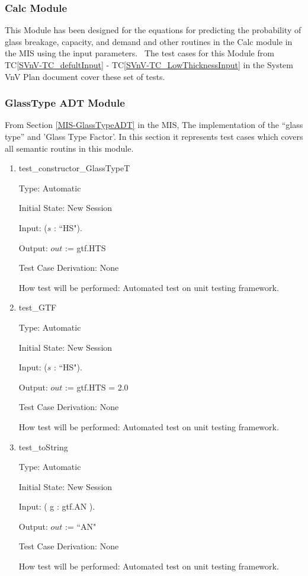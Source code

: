 \documentclass[12pt]{article}
\newcommand{\tcref}[1]{TC\ref{#1}}
\newcounter{utestnum} %
\begin{document}
\subsubsection{Calc Module}
	
This Module has been designed for the equations for predicting the probability of glass 
breakage, capacity, and demand and other routines in the Calc module in the MIS using the input parameters.
~\newline The test cases for this Module from \tcref{SVnV-TC_defultInput} - 
\tcref{SVnV-TC_LowThicknessInput} in the System VnV Plan document cover these set of tests. 

\subsubsection{GlassType ADT Module}	
From Section \ref{MIS-GlassTypeADT} in the MIS, The implementation of the ``glass type'' and 'Glass Type Factor'. In this section it represents test cases which covers all semantic routins in this module.

\begin{enumerate}[label=TC\arabic*:,ref={\arabic*}]
	
	\item [TC\refstepcounter{utestnum}\theutestnum: \label{ConstructorGlassTypeTTest}] 
	test\_constructor\_GlassTypeT
	
	Type: Automatic
	
	Initial State: New Session
	
	Input: ($s$ : ``HS").
	
	Output: $out$ := gtf.HTS
	
	Test Case Derivation: None
	
	How test will be performed: Automated test on unit testing framework.
	
	\item [TC\refstepcounter{utestnum}\theutestnum: \label{GTFTest}] 
	test\_GTF
	
	Type: Automatic
	
	Initial State: New Session
	
	Input: ($s$ : ``HS").
	
	Output: $out$ := gtf.HTS = 2.0
	
	Test Case Derivation: None
	
	How test will be performed: Automated test on unit testing framework.
	
	\item [TC\refstepcounter{utestnum}\theutestnum: \label{GlassTypeToStringTest}] 
	test\_toString
	
	Type: Automatic
	
	Initial State: New Session
	
	Input: ( g : gtf.AN ).
	
	Output: $out$ := ``AN"
	
	Test Case Derivation: None
	
	How test will be performed: Automated test on unit testing framework.
	
	
	
\end{enumerate}
\end{document}
